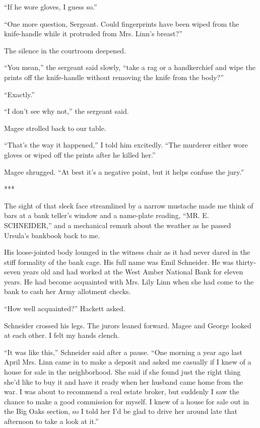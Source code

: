 \documentclass{novel}
\begin{document}
{“If he wore gloves, I guess so.”

“One more question, Sergeant. Could fingerprints have been wiped from the knife-handle while it protruded from Mrs. Linn’s breast?”

The silence in the courtroom deepened.

“You mean,” the sergeant said slowly, “take a rag or a handkerchief and wipe the prints off the knife-handle without removing the knife from the body?”

“Exactly.”

“I don’t see why not,” the sergeant said.

Magee strolled back to our table.

“That’s the way it happened,” I told him excitedly. “The murderer either wore gloves or wiped off the prints after he killed her.”

Magee shrugged. “At best it’s a negative point, but it helps confuse the jury.”

***

The sight of that sleek face streamlined by a narrow mustache made me think of bars at a bank teller’s window and a name-plate reading, “MR. E. SCHNEIDER,” and a mechanical remark about the weather as he passed Ursula’s bankbook back to me.

His loose-jointed body lounged in the witness chair as it had never dared in the stiff formality of the bank cage. His full name was Emil Schneider. He was thirty-seven years old and had worked at the West Amber National Bank for eleven years. He had become acquainted with Mrs. Lily Linn when she had come to the bank to cash her Army allotment checks.

“How well acquainted?” Hackett asked.

Schneider crossed his legs. The jurors leaned forward. Magee and George looked at each other. I felt my hands clench.

“It was like this,” Schneider said after a pause. “One morning a year ago last April Mrs. Linn came in to make a deposit and asked me casually if I knew of a house for sale in the neighborhood. She said if she found just the right thing she’d like to buy it and have it ready when her husband came home from the war. I was about to recommend a real estate broker, but suddenly I saw the chance to make a good commission for myself. I knew of a house for sale out in the Big Oaks section, so I told her I’d be glad to drive her around late that afternoon to take a look at it.”

}
\end{document}

